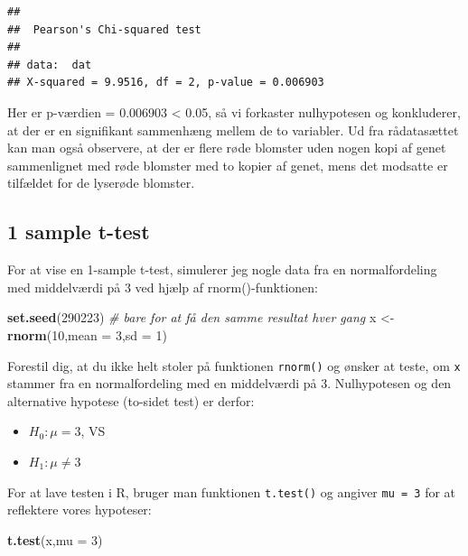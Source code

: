 \documentclass[
]{book}
\newenvironment{Shaded}{\begin{snugshade}}{\end{snugshade}}
\newcommand{\AttributeTok}[1]{\textcolor[rgb]{0.13,0.29,0.53}{#1}}
\newcommand{\CommentTok}[1]{\textcolor[rgb]{0.56,0.35,0.01}{\textit{#1}}}
\newcommand{\DecValTok}[1]{\textcolor[rgb]{0.00,0.00,0.81}{#1}}
\newcommand{\FunctionTok}[1]{\textcolor[rgb]{0.13,0.29,0.53}{\textbf{#1}}}
\newcommand{\NormalTok}[1]{#1}
\newcommand{\OtherTok}[1]{\textcolor[rgb]{0.56,0.35,0.01}{#1}}
\providecommand{\tightlist}{%
  \setlength{\itemsep}{0pt}\setlength{\parskip}{0pt}}
\begin{document}
\begin{verbatim}
## 
##  Pearson's Chi-squared test
## 
## data:  dat
## X-squared = 9.9516, df = 2, p-value = 0.006903
\end{verbatim}

Her er p-værdien = 0.006903 \textless{} 0.05, så vi forkaster nulhypotesen og konkluderer, at der er en signifikant sammenhæng mellem de to variabler. Ud fra rådatasættet kan man også observere, at der er flere røde blomster uden nogen kopi af genet sammenlignet med røde blomster med to kopier af genet, mens det modsatte er tilfældet for de lyserøde blomster.

\subsection{1 sample t-test}\label{sample-t-test}

For at vise en 1-sample t-test, simulerer jeg nogle data fra en normalfordeling med middelværdi på 3 ved hjælp af rnorm()-funktionen:

\begin{Shaded}
\begin{Highlighting}[]
\FunctionTok{set.seed}\NormalTok{(}\DecValTok{290223}\NormalTok{) }\CommentTok{\# bare for at få den samme resultat hver gang}
\NormalTok{x }\OtherTok{\textless{}{-}} \FunctionTok{rnorm}\NormalTok{(}\DecValTok{10}\NormalTok{,}\AttributeTok{mean =} \DecValTok{3}\NormalTok{,}\AttributeTok{sd =} \DecValTok{1}\NormalTok{)}
\end{Highlighting}
\end{Shaded}

Forestil dig, at du ikke helt stoler på funktionen \texttt{rnorm()} og ønsker at teste, om \texttt{x} stammer fra en normalfordeling med en middelværdi på 3. Nulhypotesen og den alternative hypotese (to-sidet test) er derfor:

\begin{itemize}
\tightlist
\item
  \(H_{0}: \mu = 3\), VS
\item
  \(H_{1}: \mu \neq 3\)
\end{itemize}

For at lave testen i R, bruger man funktionen \texttt{t.test()} og angiver \texttt{mu\ =\ 3} for at reflektere vores hypoteser:

\begin{Shaded}
\begin{Highlighting}[]
\FunctionTok{t.test}\NormalTok{(x,}\AttributeTok{mu =} \DecValTok{3}\NormalTok{)}
\end{Highlighting}
\end{Shaded}
\end{document}
